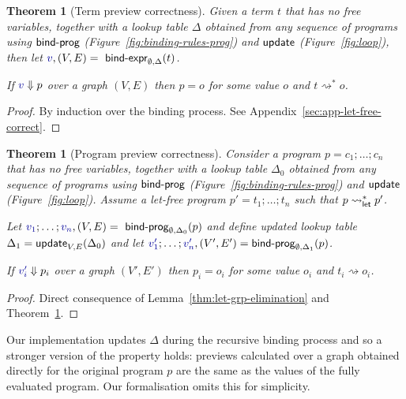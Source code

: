 \documentclass[english,submission]{programming}
\newcounter{thc}
\theoremstyle{plain}
\newtheorem{theorem}[thc]{Theorem}
\theoremstyle{definition}
\newcommand{\ident}[1]{\textnormal{\textcolor{idclr}{\sffamily #1}}}
\newcommand{\bndclr}[1]{\textcolor{kvdclr}{#1}}
\begin{document}
\begin{theorem}[Term preview correctness]
\label{thm:let-free-correct}
Given a term $t$ that has no free variables, together with a lookup table $\Delta$ obtained
from any sequence of programs using $\ident{bind-prog}$ (Figure~\ref{fig:binding-rules-prog}) and
$\ident{update}$ (Figure~\ref{fig:loop}), then
let $\bndclr{v}, (V, E) = \ident{bind-expr}_{\emptyset, \Delta}(t)$.

\vspace{0.25em}
\noindent
If $\bndclr{v}\Downarrow p$
over a graph $(V, E)$ then $p = o$ for some value $o$ and $t \rightsquigarrow^{*} o$.
\end{theorem}

\begin{proof}
By induction over the binding process. See Appendix~\ref{sec:app-let-free-correct}.
\end{proof}

\begin{theorem}[Program preview correctness]
\label{thm:correcntess}
Consider a program $p=c_1;\ldots;c_n$ that has no free variables, together with a lookup table
$\Delta_0$ obtained from any sequence of programs using $\ident{bind-prog}$
(Figure~\ref{fig:binding-rules-prog}) and $\ident{update}$ (Figure~\ref{fig:loop}). Assume a
let-free program $p'=t_1;\ldots;t_n$ such that $p\rightsquigarrow^{*}_\ident{let}p'$.

\vspace{0.25em}
\noindent
Let $\bndclr{v_1};\ldots;\bndclr{v_n}, (V, E) = \ident{bind-prog}_{\emptyset, \Delta_0}(p)$
and define updated lookup table $\Delta_1=\ident{update}_{V, E}(\Delta_0)$ and
let $\bndclr{v'_1};\ldots;\bndclr{v'_n}, (V', E') = \ident{bind-prog}_{\emptyset, \Delta_1}(p)$.

\vspace{0.25em}
\noindent
If $\bndclr{v'_i}\Downarrow p_i$ over a graph $(V', E')$ then $p_i=o_i$ for some value $o_i$ and
$t_i \rightsquigarrow o_i$.
\end{theorem}
\begin{proof}
Direct consequence of Lemma~\ref{thm:let-grp-elimination} and Theorem~\ref{thm:let-free-correct}.
\end{proof}

\noindent
Our implementation updates $\Delta$ during the recursive binding process and so a stronger version
of the property holds: previews calculated over a graph obtained directly for the original program
$p$ are the same as the values of the fully evaluated program. Our formalisation omits this for
simplicity.
\end{document}
